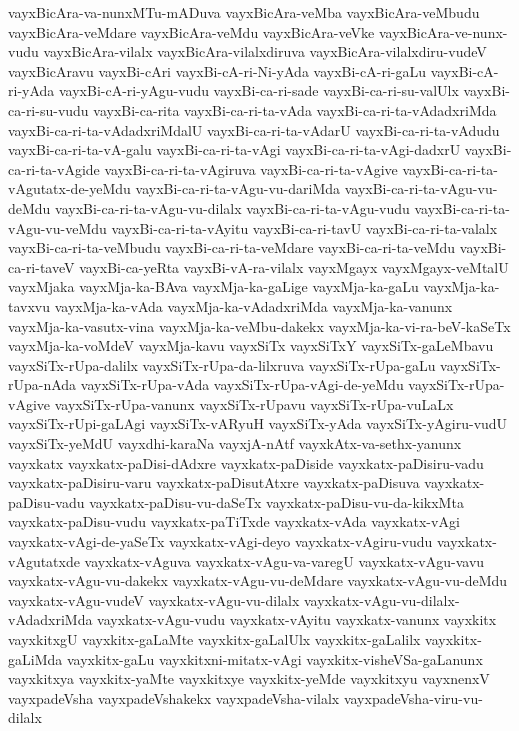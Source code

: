 {vayxBicAra-va-nunxMTu-mADuva
vayxBicAra-veMba
vayxBicAra-veMbudu
vayxBicAra-veMdare
vayxBicAra-veMdu
vayxBicAra-veVke
vayxBicAra-ve-nunx-vudu
vayxBicAra-vilalx
vayxBicAra-vilalxdiruva
vayxBicAra-vilalxdiru-vudeV
vayxBicAravu
vayxBi-cAri
vayxBi-cA-ri-Ni-yAda
vayxBi-cA-ri-gaLu
vayxBi-cA-ri-yAda
vayxBi-cA-ri-yAgu-vudu
vayxBi-ca-ri-sade
vayxBi-ca-ri-su-valUlx
vayxBi-ca-ri-su-vudu
vayxBi-ca-rita
vayxBi-ca-ri-ta-vAda
vayxBi-ca-ri-ta-vAdadxriMda
vayxBi-ca-ri-ta-vAdadxriMdalU
vayxBi-ca-ri-ta-vAdarU
vayxBi-ca-ri-ta-vAdudu
vayxBi-ca-ri-ta-vA-galu
vayxBi-ca-ri-ta-vAgi
vayxBi-ca-ri-ta-vAgi-dadxrU
vayxBi-ca-ri-ta-vAgide
vayxBi-ca-ri-ta-vAgiruva
vayxBi-ca-ri-ta-vAgive
vayxBi-ca-ri-ta-vAgutatx-de-yeMdu
vayxBi-ca-ri-ta-vAgu-vu-dariMda
vayxBi-ca-ri-ta-vAgu-vu-deMdu
vayxBi-ca-ri-ta-vAgu-vu-dilalx
vayxBi-ca-ri-ta-vAgu-vudu
vayxBi-ca-ri-ta-vAgu-vu-veMdu
vayxBi-ca-ri-ta-vAyitu
vayxBi-ca-ri-tavU
vayxBi-ca-ri-ta-valalx
vayxBi-ca-ri-ta-veMbudu
vayxBi-ca-ri-ta-veMdare
vayxBi-ca-ri-ta-veMdu
vayxBi-ca-ri-taveV
vayxBi-ca-yeRta
vayxBi-vA-ra-vilalx
vayxMgayx
vayxMgayx-veMtalU
vayxMjaka
vayxMja-ka-BAva
vayxMja-ka-gaLige
vayxMja-ka-gaLu
vayxMja-ka-tavxvu
vayxMja-ka-vAda
vayxMja-ka-vAdadxriMda
vayxMja-ka-vanunx
vayxMja-ka-vasutx-vina
vayxMja-ka-veMbu-dakekx
vayxMja-ka-vi-ra-beV-kaSeTx
vayxMja-ka-voMdeV
vayxMja-kavu
vayxSiTx
vayxSiTxY
vayxSiTx-gaLeMbavu
vayxSiTx-rUpa-dalilx
vayxSiTx-rUpa-da-lilxruva
vayxSiTx-rUpa-gaLu
vayxSiTx-rUpa-nAda
vayxSiTx-rUpa-vAda
vayxSiTx-rUpa-vAgi-de-yeMdu
vayxSiTx-rUpa-vAgive
vayxSiTx-rUpa-vanunx
vayxSiTx-rUpavu
vayxSiTx-rUpa-vuLaLx
vayxSiTx-rUpi-gaLAgi
vayxSiTx-vARyuH
vayxSiTx-yAda
vayxSiTx-yAgiru-vudU
vayxSiTx-yeMdU
vayxdhi-karaNa
vayxjA-nAtf
vayxkAtx-va-sethx-yanunx
vayxkatx
vayxkatx-paDisi-dAdxre
vayxkatx-paDiside
vayxkatx-paDisiru-vadu
vayxkatx-paDisiru-varu
vayxkatx-paDisutAtxre
vayxkatx-paDisuva
vayxkatx-paDisu-vadu
vayxkatx-paDisu-vu-daSeTx
vayxkatx-paDisu-vu-da-kikxMta
vayxkatx-paDisu-vudu
vayxkatx-paTiTxde
vayxkatx-vAda
vayxkatx-vAgi
vayxkatx-vAgi-de-yaSeTx
vayxkatx-vAgi-deyo
vayxkatx-vAgiru-vudu
vayxkatx-vAgutatxde
vayxkatx-vAguva
vayxkatx-vAgu-va-varegU
vayxkatx-vAgu-vavu
vayxkatx-vAgu-vu-dakekx
vayxkatx-vAgu-vu-deMdare
vayxkatx-vAgu-vu-deMdu
vayxkatx-vAgu-vudeV
vayxkatx-vAgu-vu-dilalx
vayxkatx-vAgu-vu-dilalx-vAdadxriMda
vayxkatx-vAgu-vudu
vayxkatx-vAyitu
vayxkatx-vanunx
vayxkitx
vayxkitxgU
vayxkitx-gaLaMte
vayxkitx-gaLalUlx
vayxkitx-gaLalilx
vayxkitx-gaLiMda
vayxkitx-gaLu
vayxkitxni-mitatx-vAgi
vayxkitx-visheVSa-gaLanunx
vayxkitxya
vayxkitx-yaMte
vayxkitxye
vayxkitx-yeMde
vayxkitxyu
vayxnenxV
vayxpadeVsha
vayxpadeVshakekx
vayxpadeVsha-vilalx
vayxpadeVsha-viru-vu-dilalx
}
